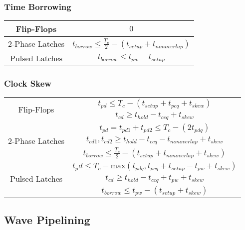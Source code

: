 \documentclass{formulae}
\begin{document}
\begin{multicols*}{2}
            \subsubsection{Time Borrowing}
            \begin{tabular}{| c | c |}
                \hline
                Flip-Flops & $0$ \\
                \hline
                2-Phase Latches & $t_{borrow} \leq \frac{T_c}{2} - (t_{setup} + t_{nonoverlap})$ \\
                \hline
                Pulsed Latches & $t_{borrow} \leq t_{pw} - t_{setup}$ \\
                \hline
            \end{tabular}

            \subsubsection{Clock Skew}
            \begin{tabular}{| c | c |}
                \hline
                \multirow{2}{4em}{Flip-Flops} & $t_{pd} \leq T_c - (t_{setup} + t_{pcq} + t_{skew})$ \\
                & $t_{cd} \geq t_{hold} - t_{ccq} + t_{skew}$\\
                \hline
                \multirow{3}{4em}{2-Phase Latches} & $t_{pd} = t_{pd1} + t_{pd2} \leq T_c - (2t_{pdq})$ \\
                & $t_{cd1},t_{cd2} \geq t_{hold} - t_{ccq} - t_{nonoverlap} + t_{skew}$\\
                & $t_{borrow} \leq \frac{T_c}{2} - (t_{setup} + t_{nonoverlap} + t_{skew})$\\
                \hline
                \multirow{3}{4em}{Pulsed Latches} & $t_pd \leq T_c - \text{max}\left( t_{pdq}, t_{pcq} + t_{setup} - t_{pw} + t_{skew}\right)$ \\
                & $t_{cd} \geq t_{hold} - t_{ccq} + t_{pw} + t_{skew}$ \\
                & $t_{borrow} \leq t_{pw} - (t_{setup} +t_{skew})$\\
                \hline
            \end{tabular}
        \subsection{Wave Pipelining}

\end{multicols*}
\end{document}
